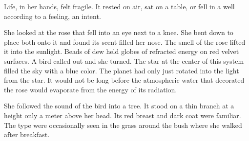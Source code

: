 

Life, in her hands, felt fragile.  It rested on air, sat on a table,
or fell in a well according to a feeling, an intent.  

She looked at the rose that fell into an eye next to a knee.  She bent
down to place both onto it and found its scent filled her nose.  The
smell of the rose lifted it into the sunlight.  Beads of dew held
globes of refracted energy on red velvet surfaces.  A bird called out
and she turned.  The star at the center of this system filled the sky
with a blue color.  The planet had only just rotated into the light
from the star.  It would not be long before the atmospheric water that
decorated the rose would evaporate from the energy of its radiation.

She followed the sound of the bird into a tree.  It stood on a thin
branch at a height only a meter above her head.  Its red breast and
dark coat were familiar.  The type were occasionally seen in the grass
around the bush where she walked after breakfast.  

\bye
